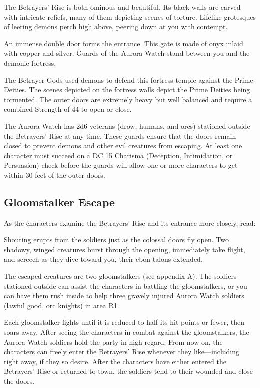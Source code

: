 \documentclass[10pt,a4paper,twoside,bg=print,twocolumn,openany,nodeprecatedcode]{dndbook}
\begin{document}
\begin{DndReadAloud}{}
The Betrayers' Rise is both ominous and beautiful. Its black walls are carved with intricate reliefs, many of them depicting scenes of torture. Lifelike grotesques of leering demons perch high above, peering down at you with contempt.

An immense double door forms the entrance. This gate is made of onyx inlaid with copper and silver. Guards of the Aurora Watch stand between you and the demonic fortress.

\end{DndReadAloud}

The Betrayer Gods used demons to defend this fortress-temple against the Prime Deities. The scenes depicted on the fortress walls depict the Prime Deities being tormented. The outer doors are extremely heavy but well balanced and require a combined Strength of 44 to open or close.

The Aurora Watch has 2d6 veterans (drow, humans, and orcs) stationed outside the Betrayers' Rise at any time. These guards ensure that the doors remain closed to prevent demons and other evil creatures from escaping. At least one character must succeed on a DC 15 Charisma (Deception, Intimidation, or Persuasion) check before the guards will allow one or more characters to get within 30 feet of the outer doors.

\subsection{Gloomstalker Escape}
As the characters examine the Betrayers' Rise and its entrance more closely, read:

\begin{DndReadAloud}{}
Shouting erupts from the soldiers just as the colossal doors fly open. Two shadowy, winged creatures burst through the opening, immediately take flight, and screech as they dive toward you, their ebon talons extended.

\end{DndReadAloud}

The escaped creatures are two gloomstalkers (see appendix A). The soldiers stationed outside can assist the characters in battling the gloomstalkers, or you can have them rush inside to help three gravely injured Aurora Watch soldiers (lawful good, orc knights) in area R1.

Each gloomstalker fights until it is reduced to half its hit points or fewer, then soars away. After seeing the characters in combat against the gloomstalkers, the Aurora Watch soldiers hold the party in high regard. From now on, the characters can freely enter the Betrayers' Rise whenever they like—including right away, if they so desire. After the characters have either entered the Betrayers' Rise or returned to town, the soldiers tend to their wounded and close the doors.
\end{document}
